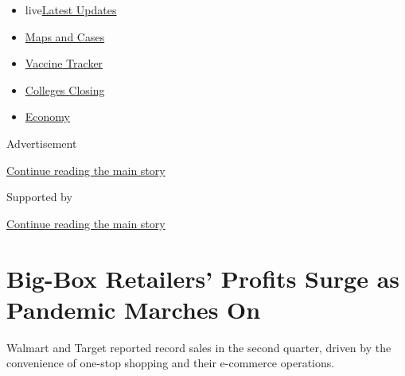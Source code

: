 \begin{itemize}
\tightlist
\item
  live\href{https://www.nytimes3xbfgragh.onion/2020/08/20/world/coronavirus-covid.html?name=styln-coronavirus-markets\&region=TOP_BANNER\&variant=undefined\&block=storyline_menu_recirc\&action=click\&pgtype=Article\&impression_id=ad576bf1-e383-11ea-9f6a-a5fba7157dfa}{Latest
  Updates}
\item
  \href{https://www.nytimes3xbfgragh.onion/interactive/2020/us/coronavirus-us-cases.html?name=styln-coronavirus-markets\&region=TOP_BANNER\&variant=undefined\&block=storyline_menu_recirc\&action=click\&pgtype=Article\&impression_id=ad576bf2-e383-11ea-9f6a-a5fba7157dfa}{Maps
  and Cases}
\item
  \href{https://www.nytimes3xbfgragh.onion/interactive/2020/science/coronavirus-vaccine-tracker.html?name=styln-coronavirus-markets\&region=TOP_BANNER\&variant=undefined\&block=storyline_menu_recirc\&action=click\&pgtype=Article\&impression_id=ad576bf3-e383-11ea-9f6a-a5fba7157dfa}{Vaccine
  Tracker}
\item
  \href{https://www.nytimes3xbfgragh.onion/2020/08/19/us/colleges-closing-covid.html?name=styln-coronavirus-markets\&region=TOP_BANNER\&variant=undefined\&block=storyline_menu_recirc\&action=click\&pgtype=Article\&impression_id=ad579300-e383-11ea-9f6a-a5fba7157dfa}{Colleges
  Closing}
\item
  \href{https://www.nytimes3xbfgragh.onion/live/2020/08/20/business/stock-market-today-coronavirus?name=styln-coronavirus-markets\&region=TOP_BANNER\&variant=undefined\&block=storyline_menu_recirc\&action=click\&pgtype=Article\&impression_id=ad579301-e383-11ea-9f6a-a5fba7157dfa}{Economy}
\end{itemize}

Advertisement

\protect\hyperlink{after-top}{Continue reading the main story}

Supported by

\protect\hyperlink{after-sponsor}{Continue reading the main story}

\hypertarget{big-box-retailers-profits-surge-as-pandemic-marches-on}{%
\section{Big-Box Retailers' Profits Surge as Pandemic Marches
On}\label{big-box-retailers-profits-surge-as-pandemic-marches-on}}

Walmart and Target reported record sales in the second quarter, driven
by the convenience of one-stop shopping and their e-commerce operations.

